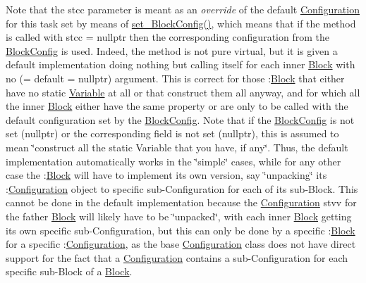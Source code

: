 Note that the stcc parameter is meant as an {\itshape override} of the default \mbox{\hyperlink{class_s_m_spp__di__unipi__it_1_1_configuration}{Configuration}} for this task set by means of \mbox{\hyperlink{class_s_m_spp__di__unipi__it_1_1_block_a18d411b740a47db00d15083c5c7ef2ba}{set\+\_\+\+Block\+Config()}}, which means that if the method is called with stcc = nullptr then the corresponding configuration from the \mbox{\hyperlink{class_s_m_spp__di__unipi__it_1_1_block_config}{Block\+Config}} is used. Indeed, the method is not pure virtual, but it is given a default implementation doing nothing but calling itself for each inner \mbox{\hyperlink{class_s_m_spp__di__unipi__it_1_1_block}{Block}} with no (= default = nullptr) argument. This is correct for those \+:\mbox{\hyperlink{class_s_m_spp__di__unipi__it_1_1_block}{Block}} that either have no static \mbox{\hyperlink{class_s_m_spp__di__unipi__it_1_1_variable}{Variable}} at all or that construct them all anyway, and for which all the inner \mbox{\hyperlink{class_s_m_spp__di__unipi__it_1_1_block}{Block}} either have the same property or are only to be called with the default configuration set by the \mbox{\hyperlink{class_s_m_spp__di__unipi__it_1_1_block_config}{Block\+Config}}. Note that if the \mbox{\hyperlink{class_s_m_spp__di__unipi__it_1_1_block_config}{Block\+Config}} is not set (nullptr) or the corresponding field is not set (nullptr), this is assumed to mean \char`\"{}construct all the static Variable
that you have, if any\char`\"{}. Thus, the default implementation automatically works in the \char`\"{}simple\char`\"{} cases, while for any other case the \+:\mbox{\hyperlink{class_s_m_spp__di__unipi__it_1_1_block}{Block}} will have to implement its own version, say \char`\"{}unpacking\char`\"{} its \+:\mbox{\hyperlink{class_s_m_spp__di__unipi__it_1_1_configuration}{Configuration}} object to specific sub-\/\+Configuration for each of its sub-\/\+Block. This cannot be done in the default implementation because the \mbox{\hyperlink{class_s_m_spp__di__unipi__it_1_1_configuration}{Configuration}} stvv for the father \mbox{\hyperlink{class_s_m_spp__di__unipi__it_1_1_block}{Block}} will likely have to be \char`\"{}unpacked\char`\"{}, with each inner \mbox{\hyperlink{class_s_m_spp__di__unipi__it_1_1_block}{Block}} getting its own specific sub-\/\+Configuration, but this can only be done by a specific \+:\mbox{\hyperlink{class_s_m_spp__di__unipi__it_1_1_block}{Block}} for a specific \+:\mbox{\hyperlink{class_s_m_spp__di__unipi__it_1_1_configuration}{Configuration}}, as the base \mbox{\hyperlink{class_s_m_spp__di__unipi__it_1_1_configuration}{Configuration}} class does not have direct support for the fact that a \mbox{\hyperlink{class_s_m_spp__di__unipi__it_1_1_configuration}{Configuration}} contains a sub-\/\+Configuration for each specific sub-\/\+Block of a \mbox{\hyperlink{class_s_m_spp__di__unipi__it_1_1_block}{Block}}. \mbox{\label{class_s_m_spp__di__unipi__it_1_1_block_aff77eeb7e486daeeb142f0548478e8e3}} 
